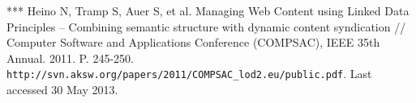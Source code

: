 \documentclass[conference,a4paper]{IEEEtran}
\providecommand\url[1]{\texttt{#1}}
\begin{document}
\begin{thebibliography}{99}
 ***
  Heino N, Tramp S, Auer S, et al. Managing Web Content using Linked
  Data Principles -- Combining semantic structure with dynamic content
  syndication // Computer Software and Applications Conference
  (COMPSAC), IEEE 35th Annual. 2011. P. 245-250.
  \url{http://svn.aksw.org/papers/2011/COMPSAC\_lod2.eu/public.pdf}. Last accessed 30 May 2013.
\end{thebibliography}
\end{document}
